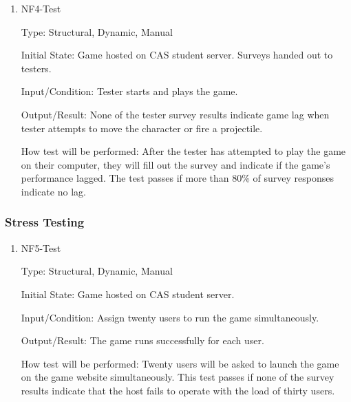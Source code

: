 \documentclass[12pt, titlepage]{article}
\begin{document}
\begin{enumerate}

\item{NF4-Test\\}

Type: Structural, Dynamic, Manual 
					
Initial State: Game hosted on CAS student server. Surveys handed out to testers.
					
Input/Condition: Tester starts and plays the game. 
					
Output/Result: None of the tester survey results indicate game lag when tester attempts to move the character or fire a projectile.
					
How test will be performed: After the tester has attempted to play the game on their computer, they will fill out the survey and indicate if the game's performance lagged. The test passes if more than 80\% of survey responses indicate no lag.

\end{enumerate}

\subsubsection{Stress Testing}

\begin{enumerate}

\item{NF5-Test\\}

Type: Structural, Dynamic, Manual
					
Initial State: Game hosted on CAS student server.
					
Input/Condition: Assign twenty users to run the game simultaneously.
					
Output/Result: The game runs successfully for each user.
					
How test will be performed: Twenty users will be asked to launch the game on the game website simultaneously. This test passes if none of the survey results indicate that the host fails to operate with the load of thirty users.

\end{enumerate}
\end{document}
